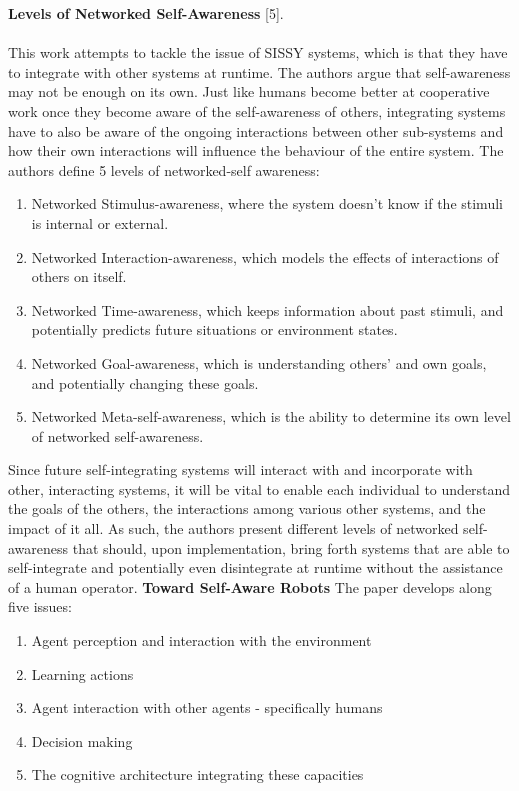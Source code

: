 \documentclass{amsbook}
\begin{document}
{{\textbf{Levels of Networked Self-Awareness} [5]. \\\\This work attempts to tackle the issue of SISSY systems, which is that they have to integrate with other systems at runtime. The authors argue that self-awareness may not be enough on its own. Just like humans become better at cooperative work once they become aware of the self-awareness of others, integrating systems have to also be aware of the ongoing interactions between other sub-systems and how their own interactions will inﬂuence the behaviour of the entire system. 
The authors define 5 levels of networked-self awareness:
\begin{enumerate}
    \item Networked Stimulus-awareness, where the system doesn’t know if the stimuli is internal or external. 
    \item Networked Interaction-awareness, which models the effects of interactions of others on itself.
    \item Networked Time-awareness, which keeps information about past stimuli, and potentially predicts future situations or environment states.
    \item Networked Goal-awareness, which is understanding others’ and own goals, and potentially changing these goals.
    \item Networked Meta-self-awareness, which is the ability to determine its own level of networked self-awareness.
\end{enumerate}
Since future self-integrating systems will interact with and incorporate with other, interacting systems, it will be vital to enable each individual to understand the goals of the others, the interactions among various other systems, and the impact of it all. As such, the authors present  different levels of networked self-awareness that should, upon implementation, bring forth systems that are able to self-integrate and potentially even disintegrate at runtime without the assistance of a human operator. 
\clearpage
\textbf{Toward Self-Aware Robots}
\vskip 0.5cm
The paper develops along ﬁve issues: 
\begin{enumerate}
    \item Agent perception and interaction with the environment
    \item Learning actions
    \item Agent interaction with other agents - specifically humans
    \item Decision making
    \item The cognitive architecture integrating these capacities

\end{enumerate}}}
\end{document}
